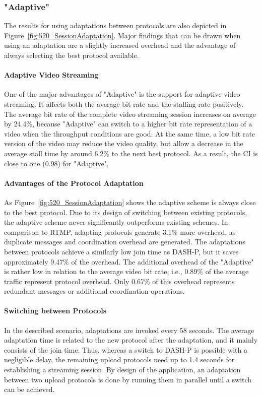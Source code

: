 \subsubsection{"Adaptive"}
The results for using adaptations between protocols are also depicted in Figure~\ref{fig:520_SessionAdaptation}.
Major findings that can be drawn when using an adaptation are a slightly increased overhead and the advantage of always selecting the best protocol available.
\paragraph{Adaptive Video Streaming}
 One of the major advantages of "Adaptive" is the support for adaptive video streaming.
 It affects both the average bit rate and the \ac{stalling} rate positively.
 The average bit rate of the complete video streaming session increases on average by 24.4\%, because "Adaptive" can switch to a higher bit rate representation of a video when the throughput conditions are good.
 At the same time, a low bit rate version of the video may reduce the video quality, but allow a decrease in the average stall time by around 6.2\% to the next best protocol.
 As a result, the \ac{CI} is close to one (0.98) for "Adaptive". 
\paragraph{Advantages of the Protocol Adaptation}
As Figure~\ref{fig:520_SessionAdaptation} shows the adaptive scheme is always close to the best protocol.
Due to its design of switching between existing protocols, the adaptive scheme never significantly outperforms existing schemes. 
In comparison to \ac{RTMP}, adapting protocols generate 3.1\% more overhead, as duplicate messages and coordination overhead are generated.
The adaptations between protocols achieve a similarly low join time as \ac{DASH-P}, but it saves approximately 9.47\% of the overhead.
The additional overhead of the "Adaptive" is rather low in relation to the average video bit rate, i.e., 0.89\% of the average traffic represent protocol overhead.
Only 0.67\% of this overhead represents redundant messages or additional coordination operations.
\paragraph{Switching between Protocols}
In the described scenario, adaptations are invoked every 58 seconds. 
The average adaptation time is related to the new protocol after the adaptation, and it mainly consists of the join time.
Thus, whereas a switch to \ac{DASH-P} is possible with a negligible delay, the remaining upload protocols need up to 1.4 seconds for establishing a streaming session.
By design of the application, an adaptation between two upload protocols is done by running them in parallel until a switch can be achieved.
